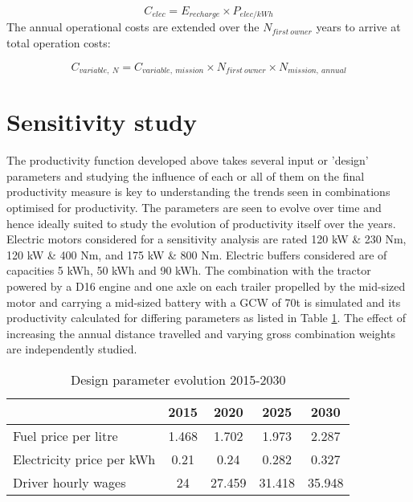 \documentclass[ExampleMasters.tex]{subfiles}
\begin{document}
			\begin{equation}
				C_{elec} = E_{recharge} \times P_{elec/kWh}
			\end{equation}
			The annual operational costs are extended over the $N_{first\ owner}$ years to arrive at total operation costs:

			\begin{equation}
				C_{variable,\ N} = C_{variable,\ mission} \times N_{first\ owner} \times N_{mission,\ annual}
			\end{equation}

	\section{Sensitivity study}
	The productivity function developed above takes several input or 'design' parameters and studying the influence of each or all of them on the final productivity measure is key to understanding the trends seen in combinations optimised for productivity. The parameters are seen to evolve over time and hence ideally suited to study the evolution of productivity itself over the years. Electric motors considered for a sensitivity analysis are rated 120 kW \& 230 Nm, 120 kW \& 400 Nm, and 175 kW \& 800 Nm. Electric buffers considered are of capacities 5 kWh, 50 kWh and 90 kWh. The combination with the tractor powered by a D16 engine and one axle on each trailer propelled by the mid-sized motor and carrying a mid-sized battery with a GCW of 70t is simulated and its productivity calculated for differing parameters as listed in Table \ref{table:ParameterSensitivity}. The effect of increasing the annual distance travelled and varying gross combination weights are independently studied. \\ 


	\begin{table}[ht]
			\centering 
			\begin{tabular}{l c c c c}
				\cline{2-5}
				\ & 2015 & 2020 & 2025 & 2030\\ 
				\hline
				Fuel price per litre & 1.468 & 1.702 & 1.973 & 2.287\\
				Electricity price per kWh & 0.21 & 0.24 & 0.282 & 0.327\\
			    Driver hourly wages  & 24 & 27.459 & 31.418 & 35.948\\
				\hline 
			\end{tabular}
			\caption{Design parameter evolution 2015-2030 \cite{ElementEnergy}} 
			\label{table:ParameterSensitivity} 
		\end{table}
\end{document}
